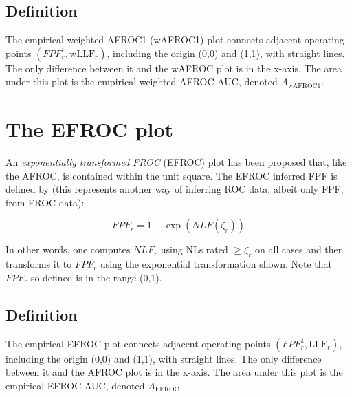 \documentclass[
]{book}
\begin{document}
\hypertarget{froc-empirical-definition-auc-wAFROC1}{%
\subsection{Definition}\label{froc-empirical-definition-auc-wAFROC1}}

The empirical weighted-AFROC1 (wAFROC1) plot connects adjacent operating points \(\left ( FPF_r^1, \text{wLLF}_r \right )\), including the origin (0,0) and (1,1), with straight lines. The only difference between it and the wAFROC plot is in the x-axis. The area under this plot is the empirical weighted-AFROC AUC, denoted \(A_{\text{wAFROC1}}\).

\hypertarget{froc-empirical-EFROC}{%
\section{The EFROC plot}\label{froc-empirical-EFROC}}

An \emph{exponentially transformed FROC} (EFROC) plot has been proposed \citep{RN2366} that, like the AFROC, is contained within the unit square. The EFROC inferred FPF is defined by (this represents another way of inferring ROC data, albeit only FPF, from FROC data):

\begin{equation}
FPF_r= 1 - \exp\left ( NLF\left ( \zeta_r \right ) \right )
\label{eq:froc-empirical-EFROC}
\end{equation}

In other words, one computes \(NLF_r\) using NLs rated \(\geq \zeta_r\) on all cases and then transforms it to \(FPF_r\) using the exponential transformation shown. Note that \(FPF_r\) so defined is in the range (0,1).

\hypertarget{froc-empirical-definition-auc-EFROC}{%
\subsection{Definition}\label{froc-empirical-definition-auc-EFROC}}

The empirical EFROC plot connects adjacent operating points \(\left ( FPF_r^1, \text{LLF}_r \right )\), including the origin (0,0) and (1,1), with straight lines. The only difference between it and the AFROC plot is in the x-axis. The area under this plot is the empirical EFROC AUC, denoted \(A_{\text{EFROC}}\).
\end{document}
